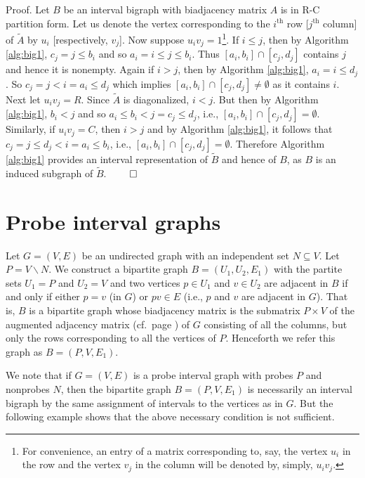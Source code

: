 \documentclass[secthm]{elsart}
\begin{document}
\vspace{-1.5em}\begin{pf*}{Proof.}
Let $B$ be an interval bigraph with biadjacency matrix $A$ is in R-C partition form. Let us denote the vertex corresponding to the $i^\textrm{th}$ row [$j^\textrm{th}$ column] of $\tilde{A}$ by $u_i$ [respectively, $v_j$]. Now suppose $u_iv_j=1$\footnote{For convenience, an entry of a matrix corresponding to, say, the vertex $u_i$ in the row and the vertex $v_j$ in the column will be denoted by, simply, $u_iv_j$.}. If $i\leqslant j$, then by Algorithm \ref{alg:big1}, $c_j=j\leqslant b_i$ and so $a_i=i\leqslant j\leqslant b_i$. Thus $[a_i,b_i]\cap [c_j,d_j]$ contains $j$ and hence it is nonempty. Again if $i>j$, then by Algorithm \ref{alg:big1}, $a_i=i\leqslant d_j$. So $c_j=j<i=a_i\leqslant d_j$ which implies $[a_i,b_i]\cap [c_j,d_j]\neq\emptyset$ as it contains $i$. Next let $u_iv_j=R$. Since $\tilde{A}$ is diagonalized, $i<j$. But then by Algorithm \ref{alg:big1}, $b_i<j$ and so $a_i\leqslant b_i<j=c_j\leqslant d_j$, i.e., $[a_i,b_i]\cap [c_j,d_j]=\emptyset$. Similarly, if $u_iv_j=C$, then $i>j$ and by Algorithm \ref{alg:big1}, it follows that $c_j=j\leqslant d_j<i=a_i\leqslant b_i$, i.e., $[a_i,b_i]\cap [c_j,d_j]=\emptyset$. Therefore Algorithm \ref{alg:big1} provides an interval representation of $\tilde{B}$ and hence of $B$, as $B$ is an induced subgraph of $\tilde{B}$. \hfill $\qed$
\end{pf*}

\section{Probe interval graphs}

Let $G=(V,E)$ be an undirected graph with an independent set $N\subseteq V$. Let $P=V\smallsetminus N$. We construct a bipartite graph $B=(U_1,U_2,E_1)$ with the partite sets $U_1=P$ and $U_2=V$ and two vertices $p\in U_1$ and $v\in U_2$ are adjacent in $B$ if and only if either $p=v$ (in $G$) or $pv\in E$ (i.e., $p$ and $v$ are adjacent in $G$). That is, $B$ is a bipartite graph whose biadjacency matrix is the submatrix $P\times V$ of the augmented adjacency matrix (cf.~page \pageref{'augmented'}) of $G$ consisting of all the columns, but only the rows corresponding to all the vertices of $P$. Henceforth we refer this graph as $B=(P,V,E_1)$.

We note that if $G=(V,E)$ is a probe interval graph with probes $P$ and nonprobes $N$, then the bipartite graph $B=(P,V,E_1)$ is necessarily an interval bigraph by the same assignment of intervals to the vertices as in $G$. But the following example shows that the above necessary condition is not sufficient.
\end{document}
